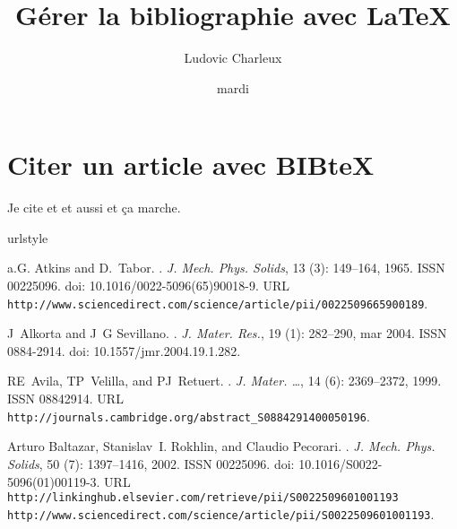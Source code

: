 \documentclass[twoside, twocolumn, a4paper]{article}
\title{Gérer la bibliographie avec \LaTeX}
\author{Ludovic Charleux}
\date{mardi}
\begin{document}
 
\maketitle
\tableofcontents
\section{Citer un article avec BIBteX}

Je cite  et \citep{Atkins1965,Fitzgerald1999} et aussi \citep{Baltazar2002} et ça marche.

%
%


\begin{thebibliography}{4}
\providecommand{\natexlab}[1]{#1}
\providecommand{\url}[1]{\texttt{#1}}
\expandafter\ifx\csname urlstyle\endcsname\relax
  \providecommand{\doi}[1]{doi: #1}\else
  \providecommand{\doi}{doi: \begingroup \urlstyle{rm}\Url}\fi

a.G. Atkins and D.~Tabor.
.
\newblock \emph{J. Mech. Phys. Solids}, 13 (3): 149--164,
  1965.
\newblock ISSN 00225096.
\newblock \doi{10.1016/0022-5096(65)90018-9}.
\newblock URL
  \url{http://www.sciencedirect.com/science/article/pii/0022509665900189}.

J~Alkorta and J~G Sevillano.
.
\newblock \emph{J. Mater. Res.}, 19 (1): 282--290, mar 2004.
\newblock ISSN 0884-2914.
\newblock \doi{10.1557/jmr.2004.19.1.282}.

RE~Avila, TP~Velilla, and PJ~Retuert.
.
\newblock \emph{J. Mater. {\ldots}}, 14 (6): 2369--2372,
  1999.
\newblock ISSN 08842914.
\newblock URL
  \url{http://journals.cambridge.org/abstract{\_}S0884291400050196}.

Arturo Baltazar, Stanislav~I. Rokhlin, and Claudio Pecorari.
.
\newblock \emph{J. Mech. Phys. Solids}, 50 (7): 1397--1416,
  2002.
\newblock ISSN 00225096.
\newblock \doi{10.1016/S0022-5096(01)00119-3}.
\newblock URL
  \url{http://linkinghub.elsevier.com/retrieve/pii/S0022509601001193
  http://www.sciencedirect.com/science/article/pii/S0022509601001193}.

\end{thebibliography}
\end{document}
